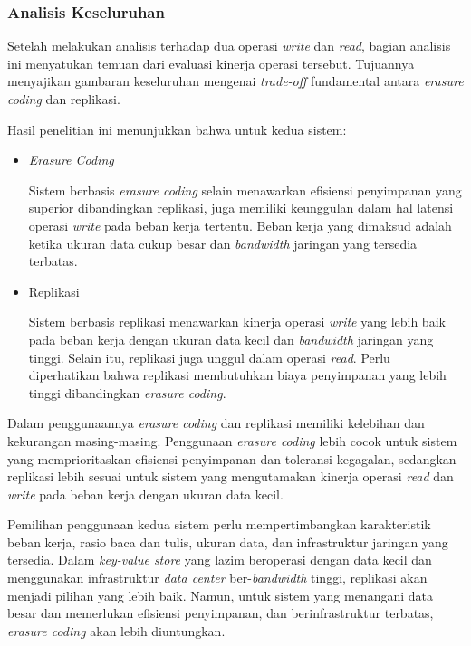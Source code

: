 \subsubsection{Analisis Keseluruhan}
\label{subsubsection:analisis-keseluruhan}

Setelah melakukan analisis terhadap dua operasi \textit{write} dan \textit{read}, bagian analisis ini menyatukan temuan dari evaluasi kinerja operasi tersebut. Tujuannya menyajikan gambaran keseluruhan mengenai \textit{trade-off} fundamental antara \textit{erasure coding} dan replikasi.

Hasil penelitian ini menunjukkan bahwa untuk kedua sistem:
\begin{itemize}
  \item \textit{Erasure Coding}
  
  Sistem berbasis \textit{erasure coding} selain menawarkan efisiensi penyimpanan yang superior dibandingkan replikasi, juga memiliki keunggulan dalam hal latensi operasi \textit{write} pada beban kerja tertentu. Beban kerja yang dimaksud adalah ketika ukuran data cukup besar dan \textit{bandwidth} jaringan yang tersedia terbatas.

  \item Replikasi
  
  Sistem berbasis replikasi menawarkan kinerja operasi \textit{write} yang lebih baik pada beban kerja dengan ukuran data kecil dan \textit{bandwidth} jaringan yang tinggi. Selain itu, replikasi juga unggul dalam operasi \textit{read}. Perlu diperhatikan bahwa replikasi membutuhkan biaya penyimpanan yang lebih tinggi dibandingkan \textit{erasure coding}.

\end{itemize}

Dalam penggunaannya \textit{erasure coding} dan replikasi memiliki kelebihan dan kekurangan masing-masing. Penggunaan \textit{erasure coding} lebih cocok untuk sistem yang memprioritaskan efisiensi penyimpanan dan toleransi kegagalan, sedangkan replikasi lebih sesuai untuk sistem yang mengutamakan kinerja operasi \textit{read} dan \textit{write} pada beban kerja dengan ukuran data kecil.

Pemilihan penggunaan kedua sistem perlu mempertimbangkan karakteristik beban kerja, rasio baca dan tulis, ukuran data, dan infrastruktur jaringan yang tersedia. Dalam \textit{key-value store} yang lazim beroperasi dengan data kecil dan menggunakan infrastruktur \textit{data center} ber-\textit{bandwidth} tinggi, replikasi akan menjadi pilihan yang lebih baik. Namun, untuk sistem yang menangani data besar dan memerlukan efisiensi penyimpanan, dan berinfrastruktur terbatas, \textit{erasure coding} akan lebih diuntungkan.
